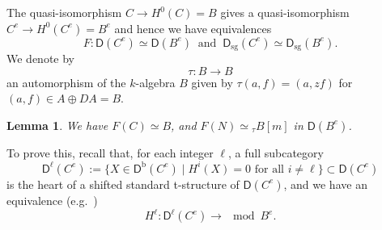 \documentclass[a4paper,reqno,11pt]{amsart}
\newtheorem{lemma}[theorem]{Lemma}
\theoremstyle{definition}
\newcommand{\DDD}{\mathsf{D}}
\newcommand{\bo}{\operatorname{b}\nolimits}
\newcommand{\sg}{\operatorname{sg}\nolimits}
\numberwithin{equation}{section}
\begin{document}
The quasi-isomorphism $C\to H^0(C)=B$ gives a quasi-isomorphism $C^e\to H^0(C^e)=B^e$ and hence we have equivalences 
\[F:\DDD(C^e)\simeq\DDD(B^e)\ \mbox{ and }\ \DDD_{\sg}(C^e)
\simeq\DDD_{\sg}(B^e).\]
We denote by
\[\tau:B\to B\]
an automorphism of the $k$-algebra $B$ given by $\tau(a,f)=(a,zf)$ for $(a,f)\in A\oplus DA=B$.

\begin{lemma}\label{N and B}
We have $F(C)\simeq B$, and $F(N)\simeq{}_\tau B[m]$ in $\DDD(B^e)$.
\end{lemma}

To prove this, recall that, for each integer $\ell$, a full subcategory
\[\DDD^{\ell}(C^e):=\{X\in\DDD^{\bo}(C^e)\mid H^i(X)=0\mbox{ for all }i\neq\ell\}\subset\DDD(C^e)\]
is the heart of a shifted standard t-structure of $\DDD(C^e)$, and we have an equivalence (e.g.\ \cite[Proposition 4.8]{IY})
\begin{equation}\label{describe heart}
H^{\ell}:\DDD^{\ell}(C^e)\to\mod B^e.
\end{equation}
\end{document}
